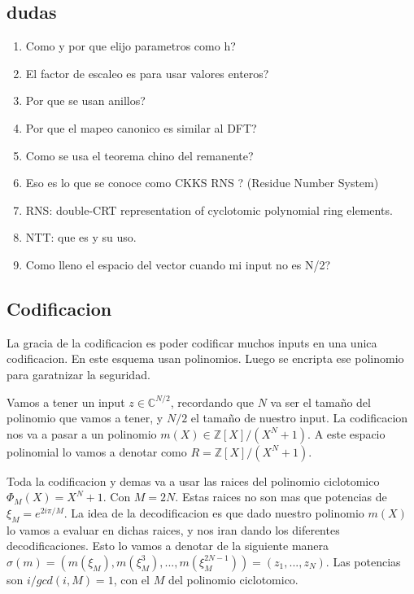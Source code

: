 \documentclass[12pt, oneside]{article}
\begin{document}
\subsection{dudas}
\begin{enumerate}
  \item Como y por que elijo parametros como h?
  \item El factor de escaleo es para usar valores enteros?
  \item Por que se usan anillos?
  \item Por que el mapeo canonico es similar al DFT?
  \item Como se usa el teorema chino del remanente?
  \item Eso es lo que se conoce como CKKS RNS ? (Residue Number System)
  \item RNS: double-CRT representation of cyclotomic polynomial ring elements.
  \item NTT: que es y su uso.
  \item Como lleno el espacio del vector cuando mi input no es N/2?
\end{enumerate}




\subsection{Codificacion}

La gracia de la codificacion es poder codificar muchos inputs en una unica codificacion.
En este esquema usan polinomios.
Luego se encripta ese polinomio para garatnizar la seguridad.

Vamos a tener un input $z\in \mathbb{C}^{N/2}$, recordando que $N$ va ser el tamaño
del polinomio que vamos a tener, y $N/2$ el tamaño de nuestro input.
La codificacion nos va a pasar a un polinomio $m(X)\in \mathbb{Z}[X]/(X^N+1)$.
A este espacio polinomial lo vamos a denotar como $R= \mathbb{Z}[X]/(X^N+1)$.

Toda la codificacion y demas va a usar las raices del polinomio ciclotomico $\Phi_M(X)=
X^N+1$.
Con $M=2N$.
Estas raices no son mas que potencias de $\xi_M=e^{2i\pi/M}$.
La idea de la decodificacion es que dado nuestro polinomio $m(X)$ lo vamos a evaluar en dichas
raices, y nos iran dando los diferentes decodificaciones.
Esto lo vamos a denotar de la siguiente manera $\sigma(m) = (m(\xi_M), m(\xi_M^3),...,m(\xi_M^{2N-1}))=(z_1,...,z_N)$.
Las potencias son $i/gcd(i,M)=1$, con el $M$ del polinomio ciclotomico.
\end{document}
